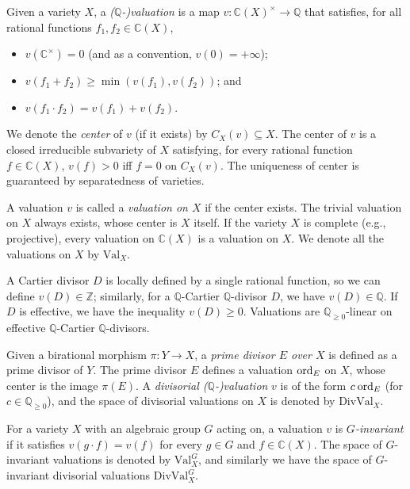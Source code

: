 \newcommand{\Val}{\mathrm{Val}}
\newcommand{\DVal}{\mathrm{DivVal}}

Given a variety $X$, a \emph{($\mathbb{Q}$-)valuation} is a map $v : \mathbb{C}(X)^\times \to \mathbb{Q}$ that satisfies, for all rational functions $f_1, f_2 \in \mathbb{C}(X)$,
\begin{itemize}
	\item $v(\mathbb{C}^\times) = 0$ (and as a convention, $v(0) = +\infty$);
	\item $v(f_1 + f_2) \geq \min(v(f_1), v(f_2))$; and
	\item $v(f_1 \cdot f_2) = v(f_1) + v(f_2)$.
\end{itemize}

We denote the \emph{center} of $v$ (if it exists) by $C_X(v) \subseteq X$. The center of $v$ is a closed irreducible subvariety of $X$ satisfying, for every rational function $f \in \mathbb{C}(X)$, $v(f) > 0$ iff $f = 0$ on $C_X(v)$. The uniqueness of center is guaranteed by separatedness of varieties.

A valuation $v$ is called a \emph{valuation on $X$} if the center exists. The trivial valuation on $X$ always exists, whose center is $X$ itself. If the variety $X$ is complete (e.g., projective), every valuation on $\mathbb{C}(X)$ is a valuation on $X$. We denote all the valuations on $X$ by $\Val_X$.

A Cartier divisor $D$ is locally defined by a single rational function, so we can define $v(D) \in \mathbb{Z}$; similarly, for a $\mathbb{Q}$-Cartier $\mathbb{Q}$-divisor $D$, we have $v(D) \in \mathbb{Q}$. If $D$ is effective, we have the inequality $v(D) \geq 0$. Valuations are $\mathbb{Q}_{\geq 0}$-linear on effective $\mathbb{Q}$-Cartier $\mathbb{Q}$-divisors.

Given a birational morphism $\pi: Y \to X$, a \emph{prime divisor $E$ over $X$} is defined as a prime divisor of $Y$. The prime divisor $E$ defines a valuation $\mathrm{ord}_E$ on $X$, whose center is the image $\pi(E)$. A \emph{divisorial ($\mathbb{Q}$-)valuation} $v$ is of the form $c \: \mathrm{ord}_E$ (for $c \in \mathbb{Q}_{\geq 0}$), and the space of divisorial valuations on $X$ is denoted by $\DVal_X$.

For a variety $X$ with an algebraic group $G$ acting on, a valuation $v$ is \emph{$G$-invariant} if it satisfies $v(g \cdot f) = v(f)$ for every $g \in G$ and $f \in \mathbb{C}(X)$. The space of $G$-invariant valuations is denoted by $\Val^G_X$, and similarly we have the space of $G$-invariant divisorial valuations $\DVal^G_X$.